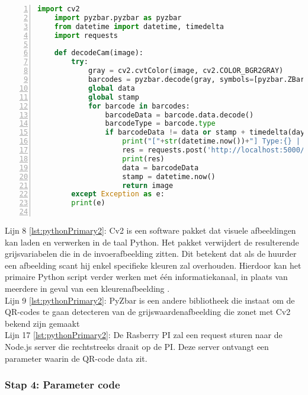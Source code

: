    \begin{lstlisting}[language=Python, caption={Het primaire uitvoerbare script van de QR-unit.}, label={lst:pythonPrimary2}, numbers=left]
    import cv2
    import pyzbar.pyzbar as pyzbar
    from datetime import datetime, timedelta
    import requests
        
    def decodeCam(image):
        try:
            gray = cv2.cvtColor(image, cv2.COLOR_BGR2GRAY)
            barcodes = pyzbar.decode(gray, symbols=[pyzbar.ZBarSymbol.QRCODE])
            global data
            global stamp
            for barcode in barcodes:
                barcodeData = barcode.data.decode()
                barcodeType = barcode.type
                if barcodeData != data or stamp + timedelta(days=0, seconds=5) < datetime.now():
                    print("["+str(datetime.now())+"] Type:{} | Data: {}".format(barcodeType, barcodeData))
                    res = requests.post('http://localhost:5000/qr-code', json = {'tag': barcodeData })
                    print(res)
                    data = barcodeData
                    stamp = datetime.now()
                    return image
        except Exception as e:
        print(e)
    
\end{lstlisting}

Lijn 8 \ref{lst:pythonPrimary2}: Cv2 is een software pakket dat visuele afbeeldingen kan laden en verwerken in de taal Python. Het pakket verwijdert de resulterende grijsvariabelen die in de invoerafbeelding zitten. Dit betekent dat als de huurder een afbeelding scant hij enkel specifieke kleuren zal overhouden. Hierdoor kan het primaire Python script verder werken met één informatiekanaal, in plaats van meerdere in geval van een kleurenafbeelding \autocite{developmentteam}.\\
Lijn 9 \ref{lst:pythonPrimary2}: PyZbar is een andere bibliotheek die instaat om de QR-codes te gaan detecteren van de grijswaardenafbeelding die zonet met Cv2 bekend zijn gemaakt \autocite{Huang2022}\\
Lijn 17 \ref{lst:pythonPrimary2}: De Rasberry PI zal een request sturen naar de Node.js server die rechtstreeks draait op de PI. Deze server ontvangt een parameter waarin de QR-code data zit.\\


\subsubsection{Stap 4: Parameter code}

